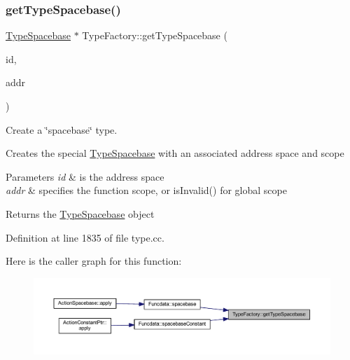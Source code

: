 \subsubsection{\texorpdfstring{getTypeSpacebase()}{getTypeSpacebase()}}
{\footnotesize\ttfamily \mbox{\hyperlink{class_type_spacebase}{Type\+Spacebase}} $\ast$ Type\+Factory\+::get\+Type\+Spacebase (\begin{DoxyParamCaption}\item[{\mbox{\hyperlink{class_addr_space}{Addr\+Space}} $\ast$}]{id,  }\item[{const \mbox{\hyperlink{class_address}{Address}} \&}]{addr }\end{DoxyParamCaption})}



Create a \char`\"{}spacebase\char`\"{} type. 

Creates the special \mbox{\hyperlink{class_type_spacebase}{Type\+Spacebase}} with an associated address space and scope 
\begin{DoxyParams}{Parameters}
{\em id} & is the address space \\
\hline
{\em addr} & specifies the function scope, or is\+Invalid() for global scope \\
\hline
\end{DoxyParams}
\begin{DoxyReturn}{Returns}
the \mbox{\hyperlink{class_type_spacebase}{Type\+Spacebase}} object 
\end{DoxyReturn}


Definition at line 1835 of file type.\+cc.

Here is the caller graph for this function\+:
\nopagebreak
\begin{figure}[H]
\begin{center}
\leavevmode
\includegraphics[width=350pt]{class_type_factory_a85de9d19ce1dc44476a414f5ce69b97e_icgraph}
\end{center}
\end{figure}
\mbox{\label{class_type_factory_aaa4a75179b840571eeb97e24642c55ee}} 
